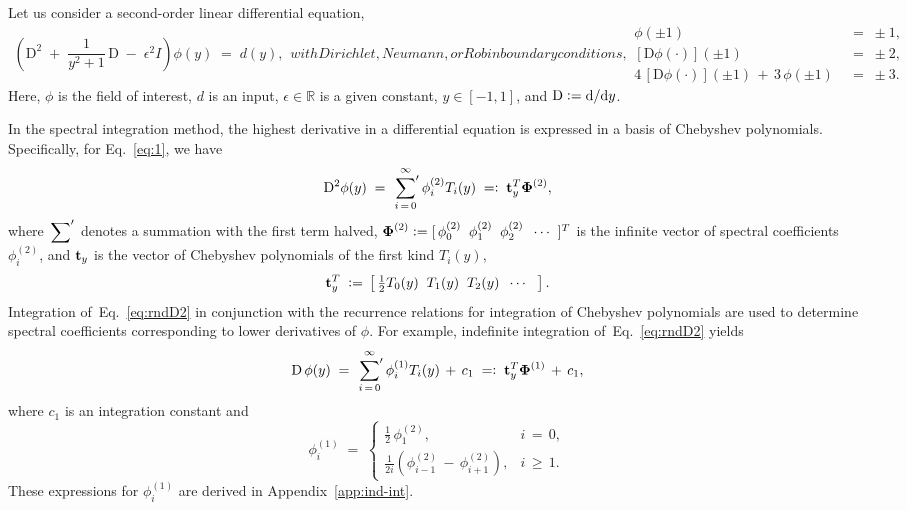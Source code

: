 \documentclass[%
secnumarabic,%
 amssymb, amsmath,%
 aps,prf,superscriptaddress,longbibliography
frontmatterverbose,
]{revtex4-2}
\newcommand{\DefinedAs}[0]{\mathrel{\mathop:}=}
\newcommand{\AsDefined}[0]{=\mathrel{\mathop:}}
\begin{document}
		\vspace*{-2ex}
Let us consider a second-order linear differential equation,
\begin{subequations}
  \begin{align}
    \left( 
 \mathrm  D^{2} \; + \; \dfrac{1}{y^2 + 1} \, \mathrm D \; - \; \epsilon^2 I 
 \right) 
 \phi (y) 
 \; = \; 
 d(y),\label{eq:1}
  \end{align}  
  with Dirichlet, Neumann, or Robin boundary conditions,
  \begin{align}
    \phi (\pm 1) \;& =\;  \pm 1, \label{eq:1Dir}
    \\
  [{\mathrm  D} \phi (\cdot)](\pm 1) \;& =\; \pm 2, \label{eq:1c}
    \\
   4\,[{\mathrm  D} \phi (\cdot)](\pm 1)  \,+\, 3\,\phi (\pm 1) \;&=\; \pm 3. \label{eq:1d}
  \end{align}
\end{subequations}
Here, $\phi$ is the field of interest, $d$ is an input, $\epsilon \in \mathbb{R}$ is a given constant, $y \in [-1, 1]$, and $\D \DefinedAs \mathrm d / \mathrm dy$.


In the spectral integration method, the highest derivative in a differential equation is expressed in a basis of Chebyshev polynomials. Specifically, for Eq.~\eqref{eq:1}, we have
\begin{align}
  \D^2\phi (y) \;=\; 
  	\sideset{}{'}\sum_{i \, = \, 0}^{\infty} \phi_i^{(2)} T_i(y)
 	\; \AsDefined \;
	  \HH t_y^T \BB \Phi^{(2)},
	  \label{eq:rndD2}
\end{align}
where $\sideset{}{'}\sum$ denotes a summation with the first term halved, $\BB \Phi^{(2)} \DefinedAs [\,\phi^{(2)}_0\;\; \phi^{(2)}_1\;\; \phi^{(2)}_2 \;\; \cdots \;\; ]^T$ is the infinite vector of spectral coefficients $\phi_i^{(2)}$, and $\mathbf{t}_y$ is the vector of Chebyshev polynomials of the first kind $T_i(y)$,
\begin{equation}\label{eq:t}
  \HH t_y^T \; \DefinedAs \, \left[\,\tfrac{1}{2}T_0(y)\;\; T_1(y)\;\; T_2(y)\;\;  \cdots \;\;\; \right].
\end{equation}
Integration of~Eq.~\eqref{eq:rndD2} in conjunction with the recurrence relations for integration of Chebyshev polynomials are used to determine spectral coefficients corresponding to lower derivatives of $\phi$. For example, indefinite integration of~Eq.~\eqref{eq:rndD2} yields
\begin{align}
  \D\, \phi (y) \;=\; \sideset{}{'}\sum_{i \, = \, 0}^{\infty} \phi_i^{(1)} T_i(y) \,+\, c_1 
  \; \AsDefined \;
	  \HH t_y^T \BB \Phi^{(1)} \,+\, c_1, \label{eq:rndD1}
  \end{align}
where $c_1$ is an integration constant and %
\begin{equation}\label{ss}
  \phi_i^{(1)} \;=\;
  \begin{cases}
    \tfrac{1}{2} \, \phi_1^{(2)}, & i \, = \, 0,
    \\[0.1cm]
  \tfrac{1}{2i} (\phi_{i-1}^{(2)}\,-\,\phi_{i+1}^{(2)}), &  i \, \geq \, 1.
  \end{cases}
  \end{equation}
These expressions for $\phi_i^{(1)}$ are derived in Appendix~\ref{app:ind-int}. 
\end{document}
